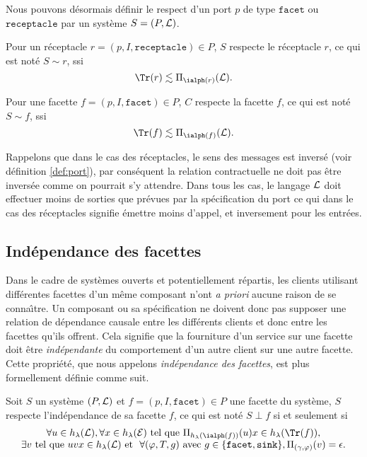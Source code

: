 Nous pouvons d\'esormais d\'efinir le respect d'un port $p$ de type
$\mathtt{facet}$ ou $\mathtt{receptacle} $ par un syst\`eme
$S=(P,{\cal L})$.

\begin{definition}
\label{def:respect-receptacles}
Pour un r\'eceptacle $r=(p,I,\mathtt{receptacle})\in P$, $S$
respecte le r\'eceptacle $r$, ce qui est not\'e $S \sim r$, ssi
$$
\Tr(r) \lesssim \Pi_{\ialph(r)}({\cal L}).
$$ 
\end{definition}


\begin{definition}
\label{def:respect-facettes}
Pour une facette $f=(p,I,\mathtt{facet})\in P$, $C$
respecte la facette $f$, ce qui est not\'e $S \sim f$, ssi
$$
\Tr(f) \lesssim \Pi_{\ialph(f)}({\cal L}).
$$ 
\end{definition}

Rappelons que dans le cas des r\'eceptacles, le sens des messages est
invers\'e (voir d\'efinition \ref{def:port}), par cons\'equent la
relation contractuelle ne doit pas \^etre invers\'ee comme on
pourrait s'y attendre. Dans tous les cas, le langage ${\cal L}$ doit
effectuer moins de sorties que pr\'evues par la sp\'ecification du
port ce qui dans le cas des r\'eceptacles signifie \'emettre moins
d'appel, et inversement pour les entr\'ees.

\subsection{Ind\'ependance des facettes}
\label{sec:indep-des-facett}
Dans le cadre de syst\`emes ouverts et potentiellement r\'epartis,
les clients utilisant diff\'erentes facettes d'un m\^eme composant
n'ont \emph{a priori} aucune raison de se conna\^{\i}tre. Un composant
ou sa sp\'ecification ne doivent donc pas supposer une relation de
d\'ependance causale entre
les diff\'erents clients et donc entre les facettes qu'ils offrent. 
 Cela signifie que la fourniture d'un service sur une facette
doit \^etre \emph{ind\'ependante} du comportement d'un autre client sur une
autre facette. Cette propri\'et\'e, que nous appelons
\emph{ind\'ependance des facettes}, est plus formellement d\'efinie
comme suit.

\begin{definition}
\label{def:indep-des-facett-1}
Soit $S$ un syst\`eme $(P,{\cal L})$ et $f=(p,I,\mathtt{facet})\in P$
une facette du syst\`eme, $S$ respecte l'ind\'ependance de sa facette $f$, ce qui est
not\'e $S \perp f$ si et seulement si 
$$
\begin{array}{c}
\forall u \in h_\lambda({\cal L}), \forall x \in h_\lambda(\mathcal{E}) \mbox{~tel que~} \Pi_{h_\lambda(\ialph(f))}(u)x \in
h_\lambda(\Tr(f)), \\\exists v
\mbox{~tel que~} uvx \in h_\lambda({\cal L}) \mbox{~et ~} \forall (\varphi,T,g) \mbox{~avec~} g \in
\{\texttt{facet},\texttt{sink}\}, \Pi_{(\gamma,\varphi)}(v) =
\epsilon.
\end{array}
$$
\end{definition}

